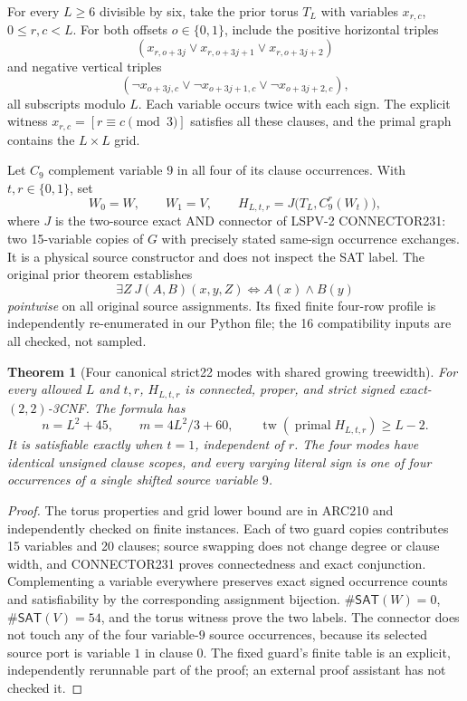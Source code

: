 \documentclass[11pt]{article}
\newtheorem{theorem}{Theorem}
\newcommand{\SAT}{\mathsf{SAT}}
\begin{document}
For every $L\ge6$ divisible by six, take the prior torus $T_L$ with variables $x_{r,c}$, $0\le r,c<L$. For both offsets $o\in\{0,1\}$, include the positive horizontal triples
\[
(x_{r,o+3j}\vee x_{r,o+3j+1}\vee x_{r,o+3j+2})
\]
and negative vertical triples
\[
(\neg x_{o+3j,c}\vee\neg x_{o+3j+1,c}\vee\neg x_{o+3j+2,c}),
\]
all subscripts modulo $L$. Each variable occurs twice with each sign. The explicit witness $x_{r,c}=[r\equiv c\pmod3]$ satisfies all these clauses, and the primal graph contains the $L\times L$ grid.

Let $C_9$ complement variable $9$ in all four of its clause occurrences. With $t,r\in\{0,1\}$, set
\[
W_0=W,\qquad W_1=V,\qquad
H_{L,t,r}=J\bigl(T_L,C_9^r(W_t)\bigr),
\]
where $J$ is the two-source exact AND connector of LSPV-2 CONNECTOR231: two 15-variable copies of $G$ with precisely stated same-sign occurrence exchanges. It is a physical source constructor and does not inspect the SAT label. The original prior theorem establishes
\[
 \exists Z\ J(A,B)(x,y,Z) \iff A(x)\land B(y)
\]
\emph{pointwise} on all original source assignments. Its fixed finite four-row profile is independently re-enumerated in our Python file; the 16 compatibility inputs are all checked, not sampled.

\begin{theorem}[Four canonical strict22 modes with shared growing treewidth]\label{th:family}
For every allowed $L$ and $t,r$, $H_{L,t,r}$ is connected, proper, and strict signed exact-$(2,2)$-3CNF. The formula has
\[
n=L^2+45,\qquad m=4L^2/3+60,\qquad
\operatorname{tw}(\operatorname{primal}H_{L,t,r})\ge L-2.
\]
It is satisfiable exactly when $t=1$, independent of $r$. The four modes have identical unsigned clause scopes, and every varying literal sign is one of four occurrences of a single shifted source variable $9$.
\end{theorem}
\begin{proof}
The torus properties and grid lower bound are in ARC210 and independently checked on finite instances. Each of two guard copies contributes 15 variables and 20 clauses; source swapping does not change degree or clause width, and CONNECTOR231 proves connectedness and exact conjunction. Complementing a variable everywhere preserves exact signed occurrence counts and satisfiability by the corresponding assignment bijection. $\#\SAT(W)=0$, $\#\SAT(V)=54$, and the torus witness prove the two labels. The connector does not touch any of the four variable-$9$ source occurrences, because its selected source port is variable $1$ in clause $0$. The fixed guard's finite table is an explicit, independently rerunnable part of the proof; an external proof assistant has not checked it.
\end{proof}
\end{document}
